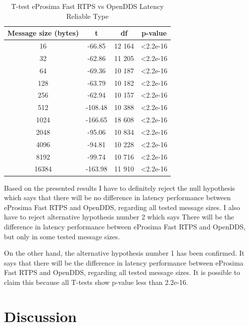 \documentclass{csfourzero}
\begin{document}
\begin{table}[!ht]
	\centering
	\caption{T-test eProsima Fast RTPS vs OpenDDS Latency Reliable Type}
	\label{T-test-latency-table-reliable}
	\begin{tabular}{|c|c|c|c|}
		\hline 
		Message size (bytes) & t & df & p-value \\ 
		\hline 
		16 & -66.85 & 12 164 & \textless 2.2e-16 \\ 
		\hline 
		32 & -62.86 & 11 205 & \textless 2.2e-16 \\ 
		\hline 
		64 & -69.36 & 10 187 & \textless 2.2e-16 \\ 
		\hline 
		128 & -63.79 & 10 182 & \textless 2.2e-16 \\ 
		\hline 
		256 & -62.94 & 10 157 & \textless 2.2e-16 \\ 
		\hline 
		512 & -108.48 & 10 388 & \textless 2.2e-16 \\ 
		\hline 
		1024 & -166.65 & 18 608 & \textless 2.2e-16 \\ 
		\hline 
		2048 & -95.06 & 10 834 & \textless 2.2e-16 \\ 
		\hline 
		4096 & -94.81 & 10 228 & \textless 2.2e-16 \\ 
		\hline 
		8192 & -99.74 & 10 716 & \textless 2.2e-16 \\ 
		\hline 
		16384 & -163.98 & 11 910 & \textless 2.2e-16 \\ 
		\hline 
	\end{tabular} 
\end{table}

Based on the presented results I have to definitely reject the null hypothesis which says that there will be no difference in latency performance between eProsima Fast RTPS and OpenDDS, regarding all tested message sizes. I also have to reject alternative hypothesis number 2 which says There will be the difference in latency performance between eProsima Fast RTPS and OpenDDS, but only in some tested message sizes.

On the other hand, the alternative hypothesis number 1 has been confirmed. It says that there will be the difference in latency performance between eProsima Fast RTPS and OpenDDS, regarding all tested message sizes. It is possible to claim this because all T-tests show p-value less than 2.2e-16.


\section{Discussion}
\label{sec:discuss}
\end{document}
